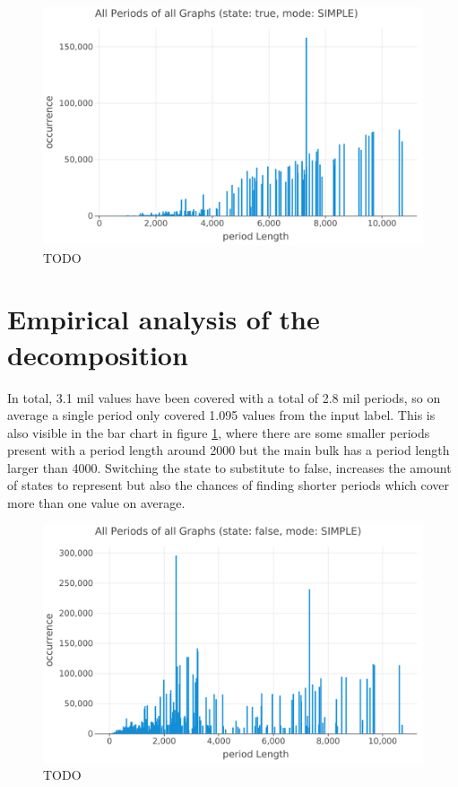 \begin{figure}[h]
	\includegraphics[width=\linewidth]{charts/all-graphs-bar-char-strue-mSIMPLE.png}
	\caption{TODO}
	\label{fig:plot-all-periods-true-state}
\end{figure}

\section{Empirical analysis of the decomposition}

In total, 3.1 mil values have been covered with a total of 2.8 mil periods, so on average a single period only covered 1.095 values from the input label. This is also visible in the bar chart in figure \ref{fig:plot-all-periods-true-state}, where there are some smaller periods present with a period length around 2000 but the main bulk has a period length larger than 4000. Switching the state to substitute to false, increases the amount of states to represent but also the chances of finding shorter periods which cover more than one value on average.

\begin{figure}[h!]
	\includegraphics[width=\linewidth]{charts/all-graphs-bar-char-sfalse-mSIMPLE.png}
	\caption{TODO}
	\label{fig:plot-all-periods-false-state}
\end{figure}

